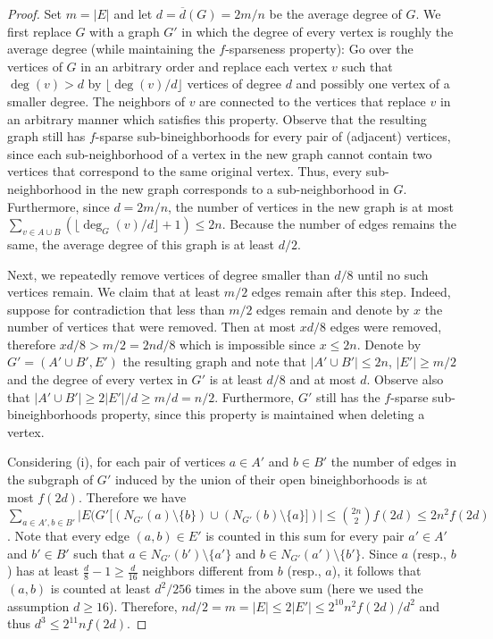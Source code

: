 \documentclass[10pt,a4paper]{amsart}
\begin{document}
\begin{proof}
	Set $m=|E|$ and let $d=\overline{d}(G)=2m/n$ be the average degree of $G$.
	We first replace $G$ with a graph $G'$ in which the degree of every vertex is roughly the average degree (while maintaining the $f$-sparseness property):
	Go over the vertices of $G$ in an arbitrary order and replace each vertex $v$ such that $\deg(v)>d$ by $\lfloor \deg(v)/d \rfloor$ vertices of degree $d$ and possibly one vertex of a smaller degree.
	The neighbors of $v$ are connected to the vertices that replace $v$ in an arbitrary manner which satisfies this property.
	Observe that the resulting graph still has $f$-sparse sub-bineighborhoods for every pair of (adjacent) vertices, since each sub-neighborhood of a vertex in the new graph cannot contain two vertices that correspond to the same original vertex.
	Thus, every sub-neighborhood in the new graph corresponds to a sub-neighborhood in $G$.
	Furthermore, since $d=2m/n$, the number of vertices in the new graph is at most $\sum_{v \in A\cup B} (\lfloor \deg_{G}(v)/d \rfloor + 1) \le 2n$. 
	Because the number of edges remains the same, the average degree of this graph is at least $d/2$.
	
	Next, we repeatedly remove vertices of degree smaller than $d/8$ until no such vertices remain.
	We claim that at least $m/2$ edges remain after this step.
	Indeed, suppose for contradiction that less than $m/2$ edges remain and denote by $x$ the number of vertices that were removed.
	Then at most $xd/8$ edges were removed, therefore $xd/8>m/2=2nd/8$ which is impossible since $x \le 2n$.	
	Denote by $G'=(A' \cup B', E')$ the resulting graph and note that $|A' \cup B'| \le 2n$, $|E'| \ge m/2$ and the degree of every vertex in $G'$ is at least $d/8$ and at most $d$.
	Observe also that  $|A' \cup B'| \ge 2|E'|/d \ge m/d = n/2$.
	Furthermore, $G'$ still has the $f$-sparse sub-bineighborhoods property, since this property is maintained when deleting a vertex.
	
	Considering (i), for each pair of vertices $a \in A'$ and $b \in B'$ the number of edges in the subgraph of $G'$ induced by the union of their open bineighborhoods is at most $f(2d)$.
	Therefore we have $\sum_{a \in A', b \in B'}  |E(G'[(N_{G'}(a)\setminus \{b\}) \cup (N_{G'}(b) \setminus \{a\}])| \le \binom{2n}{2} f(2d) \le 2n^2 f(2d)$.
	Note that every edge $(a,b) \in E'$ is counted in this sum for every pair $a' \in A'$ and $b' \in B'$ such that $a \in N_{G'}(b') \setminus \{a'\}$ and $b \in N_{G'}(a') \setminus \{b'\}$. Since $a$ (resp., $b$) has at least $\frac{d}{8}-1 \ge \frac{d}{16}$ neighbors different from $b$ (resp., $a$), it follows that $(a,b)$ is counted at least $d^2/256$ times in the above sum (here we used the assumption $d \ge 16$).
	Therefore, $nd/2=m=|E| \le 2|E'| \le 2^{10} n^2f(2d)/d^2$ and thus $d^3 \le 2^{11}nf(2d)$.
	

\end{proof}
\end{document}
